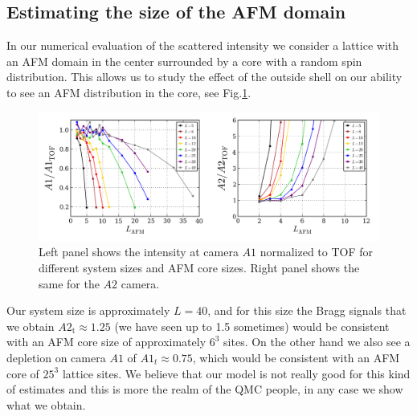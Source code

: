 \documentclass[11pt,letter]{article}
\begin{document}
\subsection{Estimating the size of the AFM domain}

In our numerical evaluation of the scattered intensity we consider a lattice
with an AFM domain in the center surrounded by a core with a random spin
distribution.   This allows us to study the effect of the outside shell on our
ability to see an AFM distribution in the core, see
Fig.\ref{fig:braggCrystalSize}.
\begin{figure}
\centering \includegraphics[width=\textwidth]{../crystalsize/CrystalSize.png}
\caption[Bragg for different system sizes]{\small Left panel shows the intensity at camera $A1$ normalized to TOF for different system sizes and AFM core sizes.  Right panel shows the same for the $A2$ camera. }
\label{fig:braggCrystalSize}
\end{figure}
   Our system size is approximately $L=40$,  and
for this size the Bragg signals that we obtain $A2_{\mathrm{t}}\approx1.25$ (we
have seen up to 1.5 sometimes) would be consistent with an AFM core size of
approximately $6^{3}$ sites.  On the other hand we also see a depletion on camera $A1$ of $A1_{t}\approx0.75$, which would be consistent with an AFM core of $25^{3}$ lattice sites.   We believe that our model is not really good for this kind of estimates and this is more the realm of the QMC people, in any case we show what we obtain.  
\end{document}
